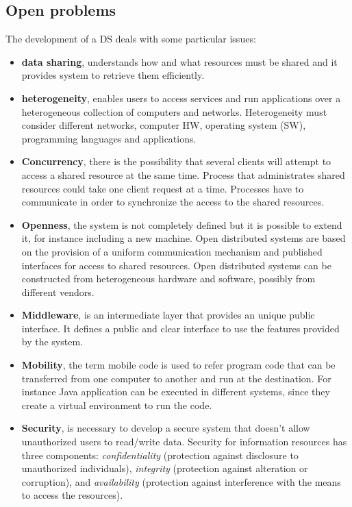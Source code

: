 \documentclass[11pt,a4paper]{article}
\begin{document}
\subsection{Open problems}
The development of a DS deals with some particular issues:
\begin{itemize}
    \item \textbf{data sharing}, understands how and what resources must be shared and it provides system to retrieve them efficiently.
    \item \textbf{heterogeneity}, enables users to access services and run applications over a heterogeneous collection of computers and networks. Heterogeneity must consider different networks, computer HW, operating system (SW), programming languages and applications.
    \item \textbf{Concurrency}, there is the possibility that several clients will attempt to access a shared resource at the same time. Process that administrates shared resources could take one client request at a time. Processes have to communicate in order to synchronize the access to the shared resources.
    \item \textbf{Openness}, the system is not completely defined but it is possible to extend it, for instance including a new machine. Open distributed systems are based on the provision of a uniform communication mechanism and published interfaces for access to shared resources. Open distributed systems can be constructed from heterogeneous hardware and software, possibly from different vendors.
    \item \textbf{Middleware}, is an intermediate layer that provides an unique public interface. It defines a public and clear interface to use the features provided by the system.
    \item \textbf{Mobility}, the term mobile code is used to refer program code that can be transferred from one computer to another and run at the destination. For instance Java application can be executed in different systems, since they create a virtual environment to run the code.
    \item \textbf{Security}, is necessary to develop a secure system that doesn't allow unauthorized users to read/write data. Security for information resources has three components: \textit{confidentiality} (protection against disclosure to unauthorized individuals), \textit{integrity} (protection against alteration or corruption), and \textit{availability} (protection against interference with the means to access the resources).

\end{itemize}
\end{document}
